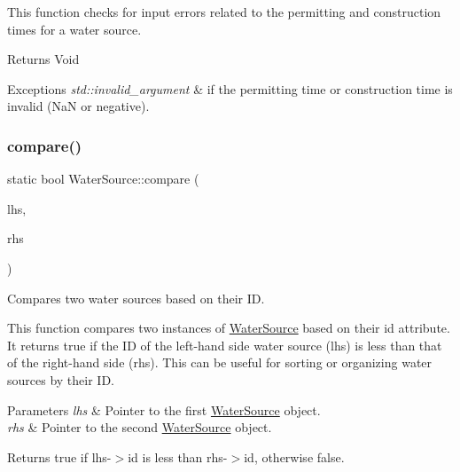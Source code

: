 This function checks for input errors related to the permitting and construction times for a water source. 

\begin{DoxyReturn}{Returns}
Void
\end{DoxyReturn}

\begin{DoxyExceptions}{Exceptions}
{\em std\+::invalid\+\_\+argument} & if the permitting time or construction time is invalid (NaN or negative). \\
\hline
\end{DoxyExceptions}
\mbox{\label{classWaterSource_a25d4ad4251b78267618b2f0ef5a501dc}} 
\subsubsection{\texorpdfstring{compare()}{compare()}}
{\footnotesize\ttfamily static bool Water\+Source\+::compare (\begin{DoxyParamCaption}\item[{\mbox{\hyperlink{classWaterSource}{Water\+Source}} $\ast$}]{lhs,  }\item[{\mbox{\hyperlink{classWaterSource}{Water\+Source}} $\ast$}]{rhs }\end{DoxyParamCaption})\hspace{0.3cm}{\ttfamily [static]}}



Compares two water sources based on their ID. 

This function compares two instances of {\ttfamily \mbox{\hyperlink{classWaterSource}{Water\+Source}}} based on their {\ttfamily id} attribute. It returns {\ttfamily true} if the ID of the left-\/hand side water source ({\ttfamily lhs}) is less than that of the right-\/hand side ({\ttfamily rhs}). This can be useful for sorting or organizing water sources by their ID.


\begin{DoxyParams}{Parameters}
{\em lhs} & Pointer to the first {\ttfamily \mbox{\hyperlink{classWaterSource}{Water\+Source}}} object. \\
\hline
{\em rhs} & Pointer to the second {\ttfamily \mbox{\hyperlink{classWaterSource}{Water\+Source}}} object.\\
\hline
\end{DoxyParams}
\begin{DoxyReturn}{Returns}
{\ttfamily true} if {\ttfamily lhs-\/$>$id} is less than {\ttfamily rhs-\/$>$id}, otherwise {\ttfamily false}. 
\end{DoxyReturn}
\mbox{\label{classWaterSource_a1137cd86f8d3f8a48ebec54282132993}} 
